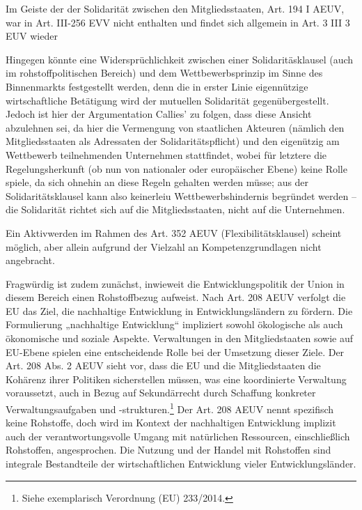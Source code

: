 \documentclass[12pt,a4paper,oneside]{book} %
\begin{document}
Im Geiste der der Solidarität zwischen den Mitgliedsstaaten, Art. 194 I AEUV, war in Art. III-256 EVV nicht enthalten und findet sich allgemein in Art. 3 III 3 EUV wieder
	
Hingegen könnte eine Widersprüchlichkeit zwischen einer Solidaritäsklausel (auch im rohstoffpolitischen Bereich) und dem Wettbewerbsprinzip im Sinne des Binnenmarkts festgestellt werden, denn die in erster Linie eigennützige wirtschaftliche Betätigung wird der mutuellen Solidarität gegenübergestellt.\autocite{Ehricke/Hackländer: ZEuS 2008, S. 579, 595f.} Jedoch ist hier der Argumentation Callies' zu folgen, dass diese Ansicht abzulehnen sei, da hier die Vermengung von staatlichen Akteuren (nämlich den Mitgliedsstaaten als Adressaten der Solidaritätspflicht) und den eigenützig am Wettbewerb teilnehmenden Unternehmen stattfindet, wobei für letztere die Regelungsherkunft (ob nun von nationaler oder europäischer Ebene) keine Rolle spiele, da sich ohnehin an diese Regeln gehalten werden müsse; aus der Solidaritätsklausel kann also keinerleiu Wettbewerbshindernis begründet werden -- die Solidarität richtet sich auf die Mitgliedsstaaten, nicht auf die Unternehmen.
	
Ein Aktivwerden im Rahmen des Art. 352 AEUV (\glqq Flexibilitätsklausel\grqq) scheint möglich, aber allein aufgrund der Vielzahl an Kompetenzgrundlagen nicht angebracht.
	
Fragwürdig ist zudem zunächst, inwieweit die Entwicklungspolitik der Union in diesem Bereich einen Rohstoffbezug aufweist. Nach Art. 208 AEUV verfolgt die EU das Ziel, die nachhaltige Entwicklung in Entwicklungsländern zu fördern. Die Formulierung „nachhaltige Entwicklung“ impliziert sowohl ökologische als auch ökonomische und soziale Aspekte. Verwaltungen in den Mitgliedstaaten sowie auf EU-Ebene spielen eine entscheidende Rolle bei der Umsetzung dieser Ziele. Der Art. 208 Abs. 2 AEUV sieht vor, dass die EU und die Mitgliedstaaten die Kohärenz ihrer Politiken sicherstellen müssen, was eine koordinierte Verwaltung voraussetzt, auch in Bezug auf Sekundärrecht durch Schaffung konkreter Verwaltungsaufgaben und -strukturen.\footnote{Siehe exemplarisch Verordnung (EU) 233/2014.} Der Art. 208 AEUV nennt spezifisch keine Rohstoffe, doch wird im Kontext der nachhaltigen Entwicklung implizit auch der verantwortungsvolle Umgang mit natürlichen Ressourcen, einschließlich Rohstoffen, angesprochen. Die Nutzung und der Handel mit Rohstoffen sind integrale Bestandteile der wirtschaftlichen Entwicklung vieler Entwicklungsländer.
	
\end{document}

